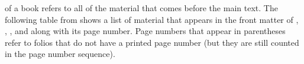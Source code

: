  of a book refers to all of the material that
comes before the main text.  The following table from shows a list of
material that appears in the front matter of \VDQI, \EI, \VE, and \BE
along with its page number.  Page numbers that appear in parentheses refer
to folios that do not have a printed page number (but they are still
counted in the page number sequence).
